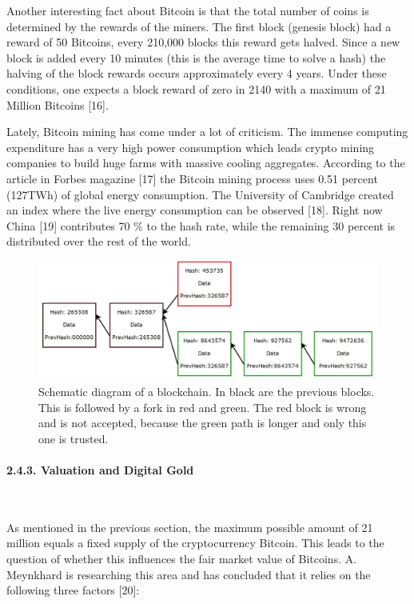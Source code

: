 \documentclass[
]{article}
\begin{document}
Another interesting fact about Bitcoin is that the total number of coins
is determined by the rewards of the miners. The first block (genesis
block) had a reward of 50 Bitcoins, every 210,000 blocks this reward
gets halved. Since a new block is added every 10 minutes (this is the
average time to solve a hash) the halving of the block rewards occurs
approximately every 4 years. Under these conditions, one expects a block
reward of zero in 2140 with a maximum of 21 Million Bitcoins {[}16{]}.

Lately, Bitcoin mining has come under a lot of criticism. The immense
computing expenditure has a very high power consumption which leads
crypto mining companies to build huge farms with massive cooling
aggregates. According to the article in Forbes magazine {[}17{]} the
Bitcoin mining process uses 0.51 percent (127TWh) of global energy
consumption. The University of Cambridge created an index where the live
energy consumption can be observed {[}18{]}. Right now China {[}19{]}
contributes 70 \% to the hash rate, while the remaining 30 percent is
distributed over the rest of the world.

\begin{figure}

{\centering \includegraphics[width=0.8\linewidth]{images/blockchain} 

}

\caption{Schematic diagram of a blockchain. In black are the previous blocks. This is followed by a fork in red and green. The red block is wrong and is not accepted, because the green path is longer and only this one is trusted.}\label{fig:blockchain}
\end{figure}

\newpage

\hypertarget{Bitcoin_valuation}{%
\paragraph{2.4.3. Valuation and Digital Gold}\label{Bitcoin_valuation}}

~

As mentioned in the previous section, the maximum possible amount of 21
million equals a fixed supply of the cryptocurrency Bitcoin. This leads
to the question of whether this influences the fair market value of
Bitcoins. A. Meynkhard is researching this area and has concluded that
it relies on the following three factors {[}20{]}:
\end{document}
